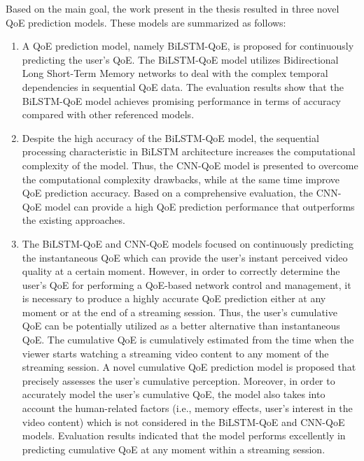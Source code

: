 Based on the main goal, the work present in the thesis resulted in three novel QoE prediction models.
These models are summarized as follows:


\begin{enumerate}
  \item A QoE prediction model, namely BiLSTM-QoE, is proposed for continuously predicting the user's QoE.
  The BiLSTM-QoE model utilizes Bidirectional Long Short-Term Memory networks to deal with the complex temporal dependencies in sequential QoE data.
  The evaluation results show that the BiLSTM-QoE model achieves promising performance in terms of accuracy compared with other referenced models.
  
  
  \item Despite the high accuracy of the BiLSTM-QoE model, the sequential processing characteristic in BiLSTM architecture increases the computational complexity of the model.
  Thus, the CNN-QoE model is presented to overcome the computational complexity drawbacks, while at the same time improve QoE prediction accuracy.
  Based on a comprehensive evaluation, the CNN-QoE model can provide a high QoE prediction performance that outperforms the existing approaches.
  
  
  \item The BiLSTM-QoE and CNN-QoE models focused on continuously predicting the instantaneous QoE which can provide the user's instant perceived video quality at a certain moment.
  However, in order to correctly determine the user's QoE for performing a QoE-based network control and management, it is necessary to produce a highly accurate QoE prediction either at any moment or at the end of a streaming session.
  Thus, the user's cumulative QoE can be potentially utilized as a better alternative than instantaneous QoE.
  The cumulative QoE is cumulatively estimated from the time when the viewer starts watching a streaming video content to any moment of the streaming session.
  A novel cumulative QoE prediction model is proposed that precisely assesses the user's cumulative perception.
  Moreover, in order to accurately model the user's cumulative QoE, the model also takes into account the human-related factors (i.e., memory effects, user's interest in the video content) which is not considered in the BiLSTM-QoE and CNN-QoE models.
  Evaluation results indicated that the model performs excellently in predicting cumulative QoE at any moment within a streaming session.
\end{enumerate}